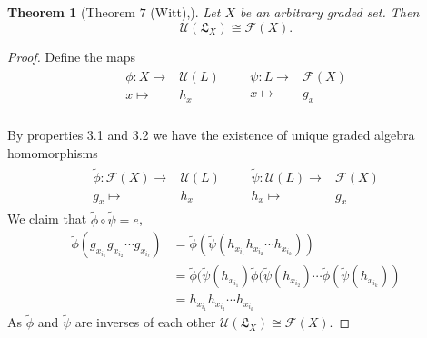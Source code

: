 \documentclass[11pt]{amsart}
\newtheorem{thm}{Theorem}
\theoremstyle{definition}
\numberwithin{equation}{section}
\begin{document}
\begin{thm}[Theorem $7$ (Witt),\cite{jacobson2013lie}]
Let $X$ be an arbitrary graded set.  Then
\[
\mathcal{U}(\mathfrak{L}_{X}) \cong \mathcal{F}(X).
\]
%
%
%
\end{thm}
\begin{proof}
Define the maps  
\begin{align*}
    \begin{array}{rcl}
        \phi :  X \longrightarrow & \mathcal{U} (L) \\
        x  \longmapsto  & h_x \\ 
    \end{array}  &&  \begin{array}{rcl}
        \psi :  L \longrightarrow &\mathcal{F}(X) \\
        x  \longmapsto  & g_x \\
    \end{array}
\end{align*}
    

By properties 3.1 and 3.2 we have the existence of unique graded algebra homomorphisms 
\begin{align*}
    \begin{array}{rcl}
        \tilde{\phi}: \mathcal{F}(X) \longrightarrow & \mathcal{U} (L) \\
        g_x \longmapsto & h_x
    \end{array} && \begin{array}{rcl}
        \tilde{\psi}: \mathcal{U}(L) \longrightarrow & \mathcal{F} (X) \\
        h_x \longmapsto & g_x
    \end{array} 
\end{align*} 
We claim that \(\tilde{\phi} \circ \tilde{\psi} = e\),
\begin{align*}
    \tilde{\phi}(g_{x_{i_{1}} }g_{x_{i_{2}}} \cdots g_{x_{i_{\ell}}}) 
    &= \tilde{\phi}(\tilde{\psi}(h_{x_{i_{1}} }h_{x_{i_{2}}} \cdots h_{x_{i_{k}}})) \\
    &=  \tilde{\phi}(\tilde{\psi}(h_{x_{i_{1}} })\tilde{\phi}(\tilde{\psi}(h_{x_{i_{2}} } )\cdots \tilde{\phi}(\tilde{\psi}(h_{x_{i_{k}} })) \\
    &= h_{x_{i_{1}} }h_{x_{i_{2}} } \cdots h_{x_{i_{k}} }
\end{align*}
As \(\tilde{\phi}\) and \(\tilde{\psi}\) are inverses of each other \(\mathcal{U}(\mathfrak{L}_{X}) \cong \mathcal{F}(X)\).
\end{proof}
\end{document}
